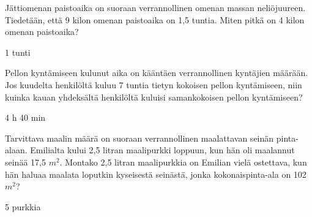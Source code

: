 \begin{tehtava}
	Jättiomenan paistoaika on suoraan verrannollinen omenan massan neliöjuureen. Tiedetään, että 9 kilon omenan paistoaika on 1,5 tuntia. Miten pitkä on 4 kilon omenan paistoaika?
    \begin{vastaus}
        1 tunti
    \end{vastaus}
\end{tehtava}

\begin{tehtava}
	Pellon kyntämiseen kulunut aika on kääntäen verrannollinen kyntäjien määrään. Jos kuudelta henkilöltä kuluu 7 tuntia tietyn kokoisen pellon kyntämiseen, niin kuinka kauan yhdeksältä henkilöltä kuluisi samankokoisen pellon kyntämiseen?
    \begin{vastaus}
        4 h 40 min
    \end{vastaus}
\end{tehtava}

\begin{tehtava}
	Tarvittava maalin määrä on suoraan verrannollinen maalattavan seinän pinta-alaan. Emilialta kului 2,5 litran maalipurkki  loppuun, kun hän oli maalannut seinää 17,5 $m^2$. Montako 2,5 litran maalipurkkia on Emilian vielä ostettava, kun hän haluaa maalata loputkin kyseisestä seinästä, jonka kokonaispinta-ala on 102 $m^2$?
    \begin{vastaus}
        5 purkkia
    \end{vastaus}
\end{tehtava}